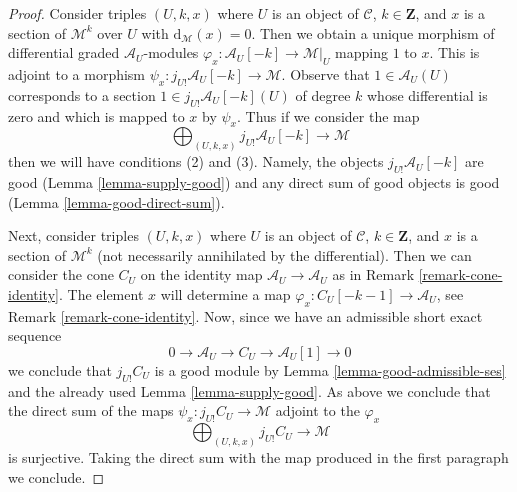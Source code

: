 \documentclass{stacks-project}
\theoremstyle{plain}
\theoremstyle{definition}
\theoremstyle{remark}
\numberwithin{equation}{subsection}
\begin{document}
\begin{proof}
Consider triples $(U, k, x)$ where $U$ is an object of $\mathcal{C}$,
$k \in \mathbf{Z}$, and $x$ is a section of $\mathcal{M}^k$ over $U$
with $\text{d}_\mathcal{M}(x) = 0$. Then we obtain a unique morphism
of differential graded $\mathcal{A}_U$-modules
$\varphi_x : \mathcal{A}_U[-k] \to \mathcal{M}|_U$
mapping $1$ to $x$. This is adjoint to a morphism
$\psi_x : j_{U!}\mathcal{A}_U[-k] \to \mathcal{M}$.
Observe that $1 \in \mathcal{A}_U(U)$ corresponds to
a section $1 \in j_{U!}\mathcal{A}_U[-k](U)$ of degree $k$
whose differential is zero and which is mapped to $x$ by $\psi_x$.
Thus if we consider the map
$$
\bigoplus\nolimits_{(U, k, x)} j_{U!}\mathcal{A}_U[-k]
\longrightarrow
\mathcal{M}
$$
then we will have conditions (2) and (3). Namely, the objects
$j_{U!}\mathcal{A}_U[-k]$ are good (Lemma \ref{lemma-supply-good})
and any direct sum of good objects is good (Lemma \ref{lemma-good-direct-sum}).

\medskip\noindent
Next, consider triples $(U, k, x)$ where $U$ is an object of $\mathcal{C}$,
$k \in \mathbf{Z}$, and $x$ is a section of $\mathcal{M}^k$ (not necessarily
annihilated by the differential). Then we can consider
the cone $C_U$ on the identity map $\mathcal{A}_U \to \mathcal{A}_U$
as in Remark \ref{remark-cone-identity}. The element $x$ will determine a map
$\varphi_x : C_U[-k - 1] \to \mathcal{A}_U$, see
Remark \ref{remark-cone-identity}. Now, since we have
an admissible short exact sequence
$$
0 \to \mathcal{A}_U \to C_U \to \mathcal{A}_U[1] \to 0
$$
we conclude that $j_{U!}C_U$ is a good module by
Lemma \ref{lemma-good-admissible-ses} and
the already used Lemma \ref{lemma-supply-good}.
As above we conclude that the direct sum of the maps
$\psi_x : j_{U!}C_U \to \mathcal{M}$ adjoint to the $\varphi_x$
$$
\bigoplus\nolimits_{(U, k, x)} j_{U!}C_U \longrightarrow \mathcal{M}
$$
is surjective. Taking the direct sum with the map produced
in the first paragraph we conclude.
\end{proof}
\end{document}
